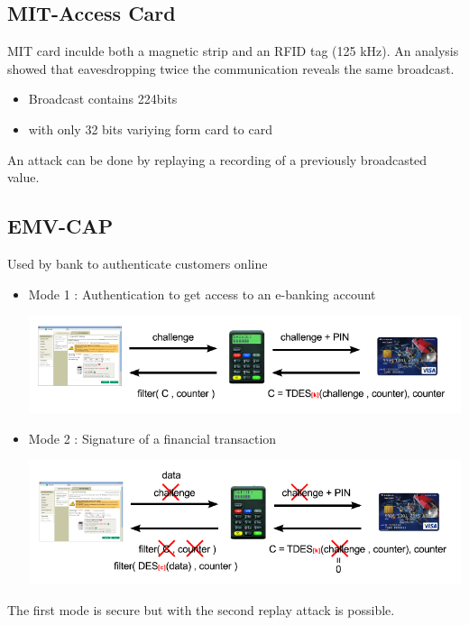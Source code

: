 \subsection{MIT-Access Card}

MIT card inculde both a magnetic strip and an RFID tag (125 kHz).
An analysis showed that eavesdropping twice the communication 
reveals the same broadcast.
\begin{itemize}
	\item Broadcast contains 224bits 
	\item with only 32 bits variying form card
	to card
\end{itemize}
An attack can be done by replaying a recording of a previously broadcasted value.

\subsection{EMV-CAP}

Used by bank to authenticate customers online 
\begin{itemize}
	\item Mode 1 : Authentication to get access to an e-banking account 
	\begin{center}
		\includegraphics[scale=0.6]{img/mode1-ebanking}
	\end{center}
	
	\item Mode 2 : Signature of a financial transaction
	\begin{center}
		\includegraphics[scale=0.6]{img/mode2-ebanking}
	\end{center}
\end{itemize}
The first mode is secure but with the second replay attack is possible. %

